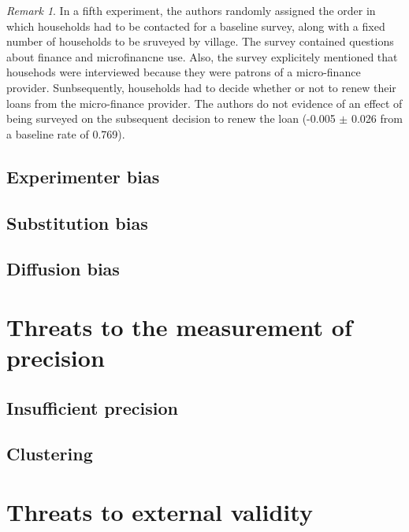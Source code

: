 \documentclass[
]{book}
\theoremstyle{definition}
\theoremstyle{definition}
\theoremstyle{definition}
\theoremstyle{definition}
\theoremstyle{remark}
\newtheorem*{remark}{Remark}
\begin{document}
\begin{remark}
In a fifth experiment, the authors randomly assigned the order in which households had to be contacted for a baseline survey, along with a fixed number of households to be sruveyed by village.
The survey contained questions about finance and microfinancne use.
Also, the survey explicitely mentioned that househods were interviewed because they were patrons of a micro-finance provider.
Sunbsequently, households had to decide whether or not to renew their loans from the micro-finance provider.
The authors do not evidence of an effect of being surveyed on the subsequent decision to renew the loan (-0.005 \(\pm\) 0.026 from a baseline rate of 0.769).
\end{remark}

\hypertarget{experimenter-bias}{%
\subsection{Experimenter bias}\label{experimenter-bias}}

\hypertarget{substitution-bias}{%
\subsection{Substitution bias}\label{substitution-bias}}

\hypertarget{diffusion-bias}{%
\subsection{Diffusion bias}\label{diffusion-bias}}

\hypertarget{threats-to-the-measurement-of-precision}{%
\section{Threats to the measurement of precision}\label{threats-to-the-measurement-of-precision}}

\hypertarget{insufficient-precision}{%
\subsection{Insufficient precision}\label{insufficient-precision}}

\hypertarget{clustering}{%
\subsection{Clustering}\label{clustering}}

\hypertarget{threats-to-external-validity}{%
\section{Threats to external validity}\label{threats-to-external-validity}}
\end{document}
